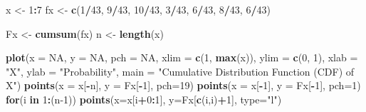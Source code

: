 \documentclass[
]{article}
\newenvironment{Shaded}{\begin{snugshade}}{\end{snugshade}}
\newcommand{\AttributeTok}[1]{\textcolor[rgb]{0.13,0.29,0.53}{#1}}
\newcommand{\ConstantTok}[1]{\textcolor[rgb]{0.56,0.35,0.01}{#1}}
\newcommand{\ControlFlowTok}[1]{\textcolor[rgb]{0.13,0.29,0.53}{\textbf{#1}}}
\newcommand{\DecValTok}[1]{\textcolor[rgb]{0.00,0.00,0.81}{#1}}
\newcommand{\FunctionTok}[1]{\textcolor[rgb]{0.13,0.29,0.53}{\textbf{#1}}}
\newcommand{\NormalTok}[1]{#1}
\newcommand{\OtherTok}[1]{\textcolor[rgb]{0.56,0.35,0.01}{#1}}
\newcommand{\SpecialCharTok}[1]{\textcolor[rgb]{0.81,0.36,0.00}{\textbf{#1}}}
\newcommand{\StringTok}[1]{\textcolor[rgb]{0.31,0.60,0.02}{#1}}
\begin{document}
\begin{Shaded}
\begin{Highlighting}[]
\NormalTok{x }\OtherTok{\textless{}{-}} \DecValTok{1}\SpecialCharTok{:}\DecValTok{7}
\NormalTok{fx }\OtherTok{\textless{}{-}} \FunctionTok{c}\NormalTok{(}\DecValTok{1}\SpecialCharTok{/}\DecValTok{43}\NormalTok{, }\DecValTok{9}\SpecialCharTok{/}\DecValTok{43}\NormalTok{, }\DecValTok{10}\SpecialCharTok{/}\DecValTok{43}\NormalTok{, }\DecValTok{3}\SpecialCharTok{/}\DecValTok{43}\NormalTok{, }\DecValTok{6}\SpecialCharTok{/}\DecValTok{43}\NormalTok{, }\DecValTok{8}\SpecialCharTok{/}\DecValTok{43}\NormalTok{, }\DecValTok{6}\SpecialCharTok{/}\DecValTok{43}\NormalTok{)}

\NormalTok{Fx }\OtherTok{\textless{}{-}} \FunctionTok{cumsum}\NormalTok{(fx)}
\NormalTok{n }\OtherTok{\textless{}{-}} \FunctionTok{length}\NormalTok{(x)}

\FunctionTok{plot}\NormalTok{(}\AttributeTok{x =} \ConstantTok{NA}\NormalTok{, }\AttributeTok{y =} \ConstantTok{NA}\NormalTok{, }\AttributeTok{pch =} \ConstantTok{NA}\NormalTok{, }
     \AttributeTok{xlim =} \FunctionTok{c}\NormalTok{(}\DecValTok{1}\NormalTok{, }\FunctionTok{max}\NormalTok{(x)), }
     \AttributeTok{ylim =} \FunctionTok{c}\NormalTok{(}\DecValTok{0}\NormalTok{, }\DecValTok{1}\NormalTok{),}
     \AttributeTok{xlab =} \StringTok{"X"}\NormalTok{,}
     \AttributeTok{ylab =} \StringTok{"Probability"}\NormalTok{,}
     \AttributeTok{main =} \StringTok{"Cumulative Distribution Function (CDF) of X"}\NormalTok{)}
\FunctionTok{points}\NormalTok{(}\AttributeTok{x =}\NormalTok{ x[}\SpecialCharTok{{-}}\NormalTok{n], }\AttributeTok{y =}\NormalTok{ Fx[}\SpecialCharTok{{-}}\DecValTok{1}\NormalTok{], }\AttributeTok{pch=}\DecValTok{19}\NormalTok{)}
\FunctionTok{points}\NormalTok{(}\AttributeTok{x =}\NormalTok{ x[}\SpecialCharTok{{-}}\DecValTok{1}\NormalTok{], }\AttributeTok{y =}\NormalTok{ Fx[}\SpecialCharTok{{-}}\DecValTok{1}\NormalTok{], }\AttributeTok{pch=}\DecValTok{1}\NormalTok{)}
\ControlFlowTok{for}\NormalTok{(i }\ControlFlowTok{in} \DecValTok{1}\SpecialCharTok{:}\NormalTok{(n}\DecValTok{{-}1}\NormalTok{)) }\FunctionTok{points}\NormalTok{(}\AttributeTok{x=}\NormalTok{x[i}\SpecialCharTok{+}\DecValTok{0}\SpecialCharTok{:}\DecValTok{1}\NormalTok{], }\AttributeTok{y=}\NormalTok{Fx[}\FunctionTok{c}\NormalTok{(i,i)}\SpecialCharTok{+}\DecValTok{1}\NormalTok{], }\AttributeTok{type=}\StringTok{"l"}\NormalTok{)}
\end{Highlighting}
\end{Shaded}
\end{document}
